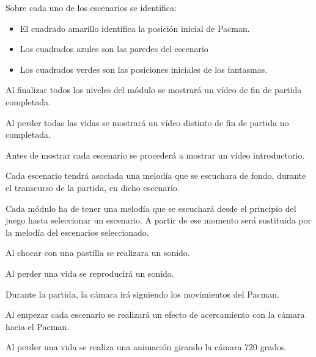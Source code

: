 \begin{description}
{	Sobre cada uno de los escenarios se identifica:
	\begin{itemize}
		\item El cuadrado amarillo identifica la posición inicial de Pacman.
		\item Los cuadrados azules son las paredes del escenario
		\item Los cuadrados verdes son las posiciones iniciales de los fantasmas.
	\end{itemize}
}

 {Al finalizar todos los niveles del módulo se mostrará un vídeo de fin de partida completada.}

 {Al perder todas las vidas se mostrará un vídeo distinto de fin de partida no completada.}

 {Antes de mostrar cada escenario se procederá a mostrar un vídeo introductorio.}

 {Cada escenario tendrá asociada una melodía que se escuchara de fondo, durante el transcurso de la partida, en dicho escenario.}

 {Cada módulo ha de tener una melodía que se escuchará desde el principio del juego hasta seleccionar un escenario. 
A partir de ese momento será sustituida por la melodía del escenarios seleccionado.}

 {Al chocar con una pastilla se realizara un sonido.}

 {Al perder una vida se reproducirá un sonido.}

 {Durante la partida, la cámara irá siguiendo los movimientos del Pacman.}

 {Al empezar cada escenario se realizará un efecto de acercamiento con la cámara hacia el Pacman.}

 {Al perder una vida se realiza una animación girando la cámara 720 grados.}
\end{description}



